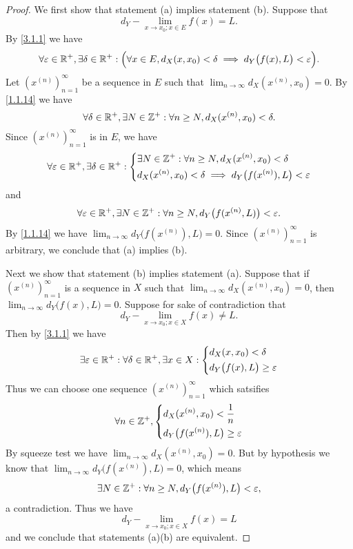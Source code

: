\begin{proof}
  We first show that statement (a) implies statement (b).
  Suppose that
  \[
    d_Y - \lim_{x \to x_0 ; x \in E} f(x) = L.
  \]
  By \cref{3.1.1} we have
  \[
    \forall \varepsilon \in \mathbb{R}^+, \exists \delta \in \mathbb{R}^+ : \Big(\forall x \in E, d_X(x, x_0) < \delta \implies d_Y\big(f(x), L\big) < \varepsilon\Big).
  \]
  Let \((x^{(n)})_{n = 1}^\infty\) be a sequence in \(E\) such that \(\lim_{n \to \infty} d_X(x^{(n)}, x_0) = 0\).
  By \cref{1.1.14} we have
  \[
    \forall \delta \in \mathbb{R}^+, \exists N \in \mathbb{Z}^+ : \forall n \geq N, d_X(x^{(n)}, x_0) < \delta.
  \]
  Since \((x^{(n)})_{n = 1}^\infty\) is in \(E\), we have
  \[
    \forall \varepsilon \in \mathbb{R}^+, \exists \delta \in \mathbb{R}^+ : \begin{dcases}
      \exists N \in \mathbb{Z}^+ : \forall n \geq N, d_X(x^{(n)}, x_0) < \delta \\
      d_X(x^{(n)}, x_0) < \delta \implies d_Y\big(f(x^{(n)}), L\big) < \varepsilon
    \end{dcases}
  \]
  and
  \[
    \forall \varepsilon \in \mathbb{R}^+, \exists N \in \mathbb{Z}^+ : \forall n \geq N, d_Y\big(f(x^{(n)}, L)\big) < \varepsilon.
  \]
  By \cref{1.1.14} we have \(\lim_{n \to \infty} d_Y\big(f(x^{(n)}), L\big) = 0\).
  Since \((x^{(n)})_{n = 1}^\infty\) is arbitrary, we conclude that (a) implies (b).

  Next we show that statement (b) implies statement (a).
  Suppose that if \((x^{(n)})_{n = 1}^\infty\) is a sequence in \(X\) such that \(\lim_{n \to \infty} d_X(x^{(n)}, x_0) = 0\), then \(\lim_{n \to \infty} d_Y\big(f(x), L\big) = 0\).
  Suppose for sake of contradiction that
  \[
    d_Y - \lim_{x \to x_0 ; x \in X} f(x) \neq L.
  \]
  Then by \cref{3.1.1} we have
  \[
    \exists \varepsilon \in \mathbb{R}^+ : \forall \delta \in \mathbb{R}^+, \exists x \in X : \begin{dcases}
      d_X(x, x_0) < \delta \\
      d_Y\big(f(x), L\big) \geq \varepsilon
    \end{dcases}
  \]
  Thus we can choose one sequence \((x^{(n)})_{n = 1}^\infty\) which satsifies
  \[
    \forall n \in \mathbb{Z}^+, \begin{dcases}
      d_X(x^{(n)}, x_0) < \dfrac{1}{n} \\
      d_Y\big(f(x^{(n)}), L\big) \geq \varepsilon
    \end{dcases}
  \]
  By squeeze test we have \(\lim_{n \to \infty} d_X(x^{(n)}, x_0) = 0\).
  But by hypothesis we know that \(\lim_{n \to \infty} d_Y\big(f(x^{(n)}), L\big) = 0\), which means
  \[
    \exists N \in \mathbb{Z}^+ : \forall n \geq N, d_Y\big(f(x^{(n)}), L\big) < \varepsilon,
  \]
  a contradiction.
  Thus we have
  \[
    d_Y - \lim_{x \to x_0 ; x \in X} f(x) = L
  \]
  and we conclude that statements (a)(b) are equivalent.


\end{proof}

